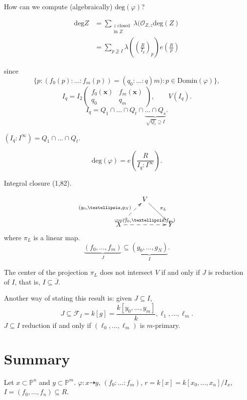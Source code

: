 \medskip\noindent
How can we compute (algebraically)
$\text{deg}(\varphi)$?

$$
\begin{aligned}
\text{deg}Z&=\sum_{\substack{z\text{ closed}
\\ \text{
in $Z$}}}
\lambda(\mathcal{O}_{Z,z}\text{deg}(Z)\\
&=
\sum_{ p \not \supseteq I}
\lambda \left(\left(
\frac{R}{I_q}\right)_p\right)
e\left(\frac{R}{p}\right)
\end{aligned}
$$

\noindent
since
$$
\{p:(f_0(p):…:f_m(p))
=(q_0:…:q)m): p \in \text{Domin}(\varphi)\},
$$
$$
I_q=I_2
\begin{pmatrix}f_0(\mathbf{x})&f_m(\mathbf{x}
)\\
q_0&q_m\end{pmatrix},\qquad  V(I_q).
$$
$$
I_q=Q_1\cap…\cap Q_t\cap\underbrace{…\cap
Q_s}_{
\sqrt{Q_i}\supseteq I}.
$$

\begin{exercise}
\label{exercise-saturation}
$(I_q:I^\infty)=Q_1\cap…\cap Q_t$.
\end{exercise}

$$
\text{deg}(\varphi)
=e\left(\frac{R}{I_q:I^\infty}\right).
$$


\medskip\noindent
Integral closure (1,82).

$$
\xymatrix{
&  V \ar[dr]^{\pi_L}\\
X\ar@{-->}[ur]^{(g_0,…,g_N)}\ar@{-->}[rr]
^{\varphi=(f_0,…,f_m)}
& & Y
}
$$
where $\pi_L$ is a linear map.
$$
\underbrace{(f_0,…,f_m)}_{J}
\subseteq \underbrace{(g_0,…,g_N)}_{I}.
$$


The center of the projection $\pi_L$
does not intersect $V$ if and only if $J$
is reduction of $I$, that is,
$I \subseteq \overline{J}$.

\medskip\noindent
Another way of stating this result is:
given $J \subseteq I$,
$$
J \subseteq \mathcal{F}_I
=k[g]
=\frac{k[y_0,…,y_m]}{k},
\ell_1,…,\ell_m.
$$
$J \subseteq I$ reduction if and only if
$(\ell_0,…,\ell_m)$ is $m$-primary.



\section{Summary}
\label{section-summary}

\noindent
Let $x \subset \mathbb{P}^n$ and $y \subset
\mathbb{P}^m$.
$\varphi:x \dashrightarrow y$, $(f_0:…:f_m)$,
$r=k[x]=k[x_0,…,x_n]/I_x$,
$I=(f_0,…,f_n) \subseteq R$.

